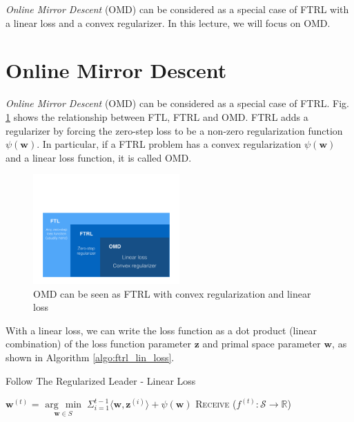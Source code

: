 \documentclass[11pt]{article}
\newcommand{\argmin}[1]{\underset{#1}{\operatorname{arg}\,\operatorname{min}}\;}
\begin{document}
\textit{Online Mirror Descent} (OMD) can be considered as a special case of FTRL with a linear loss and a convex regularizer. In this lecture, we will focus on OMD.

\section{Online Mirror Descent}

\textit{Online Mirror Descent} (OMD) \cite{lan2012validation} can be considered as a special case of FTRL. Fig. \ref{fig:ftl_ftrl_omd} shows the relationship between FTL, FTRL and OMD. FTRL adds a regularizer by forcing the zero-step loss to be a non-zero regularization function $\psi(\bm{w})$. In particular, if a FTRL problem has a convex regularization $\psi(\bm{w})$ and a linear loss function, it is called OMD.

\begin{figure}[h]
    \centering
    \includegraphics[width=0.5\textwidth]{figures/ftl_ftrl_omd.pdf}
    \caption{OMD can be seen as FTRL with convex regularization and linear loss}
    \label{fig:ftl_ftrl_omd}
\end{figure}

With a linear loss, we can write the loss function as a dot product (linear combination) of the loss function parameter $\bm{z}$ and primal space parameter $\bm{w}$, as shown in Algorithm \ref{algo:ftrl_lin_loss}.

\begin{algorithm}
  \caption{Follow The Regularized Leader - Linear Loss}
  \label{algo:ftrl_lin_loss}
  \begin{algorithmic}[1]
        \State $\bm{w}^{(t)}$ = $\argmin{\bm{w} \in S} \Sigma^{t-1}_{i=1} \langle \bm{w}, \bm{z}^{(i)} \rangle + \psi(\bm{w})$
        \State \textsc{Receive} ($f^{(t)} : \mathcal{S} \rightarrow \mathbb{R}$)
    \EndFor
    \EndFunction
  \end{algorithmic}
\end{algorithm}
\end{document}

